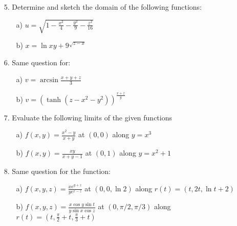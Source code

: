 \documentclass[11pt]{amsbook}
\begin{document}
\begin{enumerate}
    \item[5.] Determine and sketch the domain of the following functions:
    
        \begin{multicols}{2}
            \begin{enumerate}
                \item [a)] $ u=\sqrt{1-\frac{x^{2}}{4}-\frac{y^{2}}{9}-\frac{z^{2}}{16}}    $  
                \item [b)] $ x = \ln{xy + 9^{\sqrt{z-x}}}       $
            \end{enumerate}
        \end{multicols}
            
    \item[6.] Same question for:
    
        \begin{multicols}{2}
            \begin{enumerate}
                \item [a)] $ v = \arcsin{\frac{x+y+z}{3}}     $  %
                \item [b)] $ v = (\tanh(z-x^{2}-y^{2}))^{\frac{x+z}{y}}      $
            \end{enumerate}
        \end{multicols}
            
    \item[7.] Evaluate the following limits of the given functions
    
        
            \begin{enumerate}
                \item [a)] $ f(x,y) = \frac{x^{2}-y}{x+y}$ at $(0,0)$ along $y=x^{3}$ %
                \item [b)] $ f(x,y) = \frac{xy}{x+y-1}$ at $(0,1)$ along $y=x^{2}+1$
            \end{enumerate}
        
            
    \item[8.] Same question for the function:
    
      
            \begin{enumerate}
                \item [a)] $ f(x,y,z) = \frac{xe^{y+z}}{ye^{x-z}}$ at $(0,0,\ln{2})$ along $r(t) = (t,2t,\ln{t+2})$ 
                \item [b)] $ f(x,y,z) = \frac{x\cos{y}\sin{t}}{y\sin{x}\cos{z}}$ at $(0,\pi/2,\pi/3)$ along $r(t) = (t,\frac{\pi}{2}+t,\frac{\pi}{3}+t)$ 
            \end{enumerate}
  

\end{enumerate}
\end{document}
